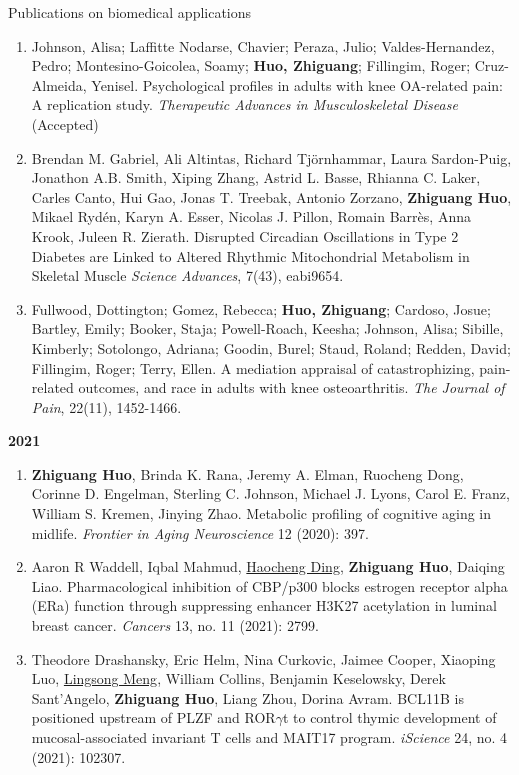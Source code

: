 \documentclass{resume} %
\begin{document}
\begin{rSection}{Publications on biomedical applications}
\begin{enumerate}[noitemsep,topsep=0pt, resume]
\item
Johnson, Alisa; Laffitte Nodarse, Chavier; Peraza, Julio; Valdes-Hernandez, Pedro; Montesino-Goicolea, Soamy; {\bf Huo, Zhiguang}; Fillingim, Roger; Cruz-Almeida, Yenisel. 
Psychological profiles in adults with knee OA-related pain: A replication study.
\emph{Therapeutic Advances in Musculoskeletal Disease} (Accepted)

\item  
Brendan M. Gabriel, Ali Altintas, Richard Tjörnhammar, Laura Sardon-Puig, Jonathon A.B. Smith, Xiping Zhang, Astrid L. Basse, Rhianna C. Laker, Carles Canto, Hui Gao, Jonas T. Treebak, Antonio Zorzano, {\bf Zhiguang Huo}, Mikael Rydén, Karyn A. Esser, Nicolas J. Pillon, Romain Barrès, Anna Krook, Juleen R. Zierath. 
Disrupted Circadian Oscillations in Type 2 Diabetes are Linked to Altered Rhythmic Mitochondrial Metabolism in Skeletal Muscle
\emph{Science Advances}, 7(43), eabi9654.

\item  
Fullwood, Dottington; Gomez, Rebecca; {\bf Huo, Zhiguang}; Cardoso, Josue; Bartley, Emily; Booker, Staja; Powell-Roach, Keesha; Johnson, Alisa; Sibille, Kimberly; Sotolongo, Adriana; Goodin, Burel; Staud, Roland; Redden, David; Fillingim, Roger; Terry, Ellen. 
A mediation appraisal of catastrophizing, pain-related outcomes, and race in adults with knee osteoarthritis. 
\emph{The Journal of Pain}, 22(11), 1452-1466.

\end{enumerate}


\textbf{2021}
\begin{enumerate}[noitemsep,topsep=0pt, resume]

\item  {\bf Zhiguang Huo}, Brinda K. Rana, Jeremy A. Elman, Ruocheng Dong, Corinne D. Engelman, Sterling C. Johnson, Michael J. Lyons, Carol E. Franz, William S. Kremen, Jinying Zhao.
Metabolic profiling of cognitive aging in midlife.
\emph{Frontier in Aging Neuroscience} 12 (2020): 397.

\item
Aaron R Waddell, Iqbal Mahmud, \underline{Haocheng Ding}, {\bf Zhiguang Huo}, Daiqing Liao. 
Pharmacological inhibition of CBP/p300 blocks estrogen receptor alpha (ERa) function through suppressing enhancer H3K27 acetylation in luminal breast cancer.
\emph{Cancers} 13, no. 11 (2021): 2799.

\item
Theodore Drashansky, Eric Helm, Nina Curkovic, Jaimee Cooper, Xiaoping Luo, \underline{Lingsong Meng}, William Collins, Benjamin Keselowsky, Derek Sant'Angelo, {\bf Zhiguang Huo}, Liang Zhou, Dorina Avram.
BCL11B is positioned upstream of PLZF and ROR$\gamma$t to control thymic development of mucosal-associated invariant T cells and MAIT17 program.
\emph{iScience}  24, no. 4 (2021): 102307.


\end{enumerate}
\end{rSection}
\end{document}
